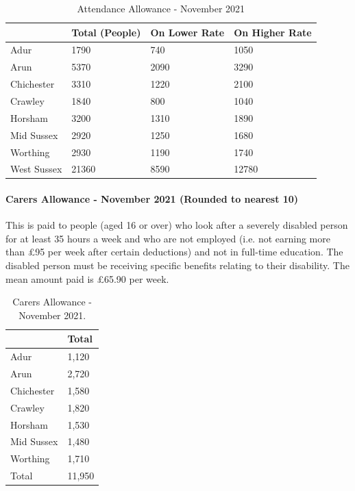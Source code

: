 \begin{table}[hbt]
    \caption{Attendance Allowance - November 2021}
    \centering
    \begin{tabular}{llll}
    \toprule
    \ & Total (People) & On Lower Rate & On Higher Rate \\
    \midrule
    Adur & 1790 & 740 & 1050 \\
    Arun & 5370 & 2090 & 3290 \\
    Chichester & 3310 & 1220 & 2100 \\
    Crawley & 1840 & 800 & 1040 \\
    Horsham & 3200 & 1310 & 1890 \\
    Mid Sussex & 2920 & 1250 & 1680 \\
    Worthing & 2930 & 1190 & 1740 \\
    West Sussex & 21360 & 8590 & 12780 \\
    \bottomrule
    \end{tabular}
    \label{tab:wa:att_all}
\end{table}



\paragraph{Carers Allowance - November 2021 (Rounded to nearest 10)} This is paid to people (aged 16 or over) who look after a severely disabled person for at least 35 hours a week and who are not employed (i.e. not earning more than £95 per week after certain deductions) and not in full-time education. The disabled person must be receiving specific benefits relating to their disability. The mean amount paid is £65.90 per week.

\begin{table}[hbt]
    \caption{Carers Allowance - November 2021.}
    \centering
    \begin{tabular}{ll}
    \toprule
    \ & Total \\
    \midrule
    Adur & 1,120 \\
    Arun & 2,720 \\
    Chichester & 1,580 \\
    Crawley & 1,820 \\
    Horsham & 1,530 \\
    Mid Sussex & 1,480 \\
    Worthing & 1,710 \\
    Total & 11,950 \\
    \bottomrule
    \end{tabular}
    \label{tab:wa:car_all}
\end{table}

